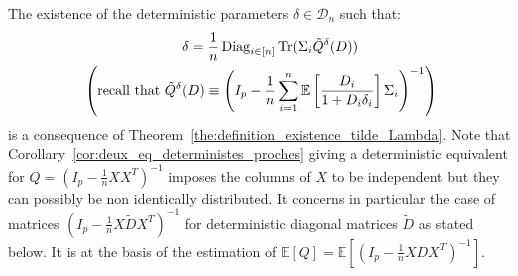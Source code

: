 \documentclass[a4papaer, titlepage]{book}
\begin{document}
The existence of the deterministic parameters $\delta \in \mathcal D_n$ such that:
\begin{align*}
   &\hspace{2.5cm}\delta = \frac{1}{n} \operatorname{Diag}_{i\in [n]} \operatorname{Tr} (\Sigma_i \tilde Q^\delta(D))\\
   & \left( \text{recall that } \tilde Q^\delta(D) \equiv  \left( I_p - \frac{1}{n} \sum_{i=1}^n \mathbb E \left[ \frac{D_i}{1+ D_i \delta_i} \right] \Sigma_i \right)^{-1}\right)
 \end{align*} 
 is a consequence of Theorem~\ref{the:definition_existence_tilde_Lambda}.
Note that Corollary~\ref{cor:deux_eq_deterministes_proches} giving a deterministic equivalent for $Q = (I_p - \frac{1}{n}XX^T)^{-1}$ imposes the columns of $X$ to be independent but they can possibly be non identically distributed. It concerns in particular the case of matrices $(I_p - \frac{1}{n}X \tilde DX^T)^{-1}$ for deterministic diagonal matrices $\tilde D$ as stated below.
It is at the basis of the estimation of $\mathbb E[Q] = \mathbb E[(I_p - \frac{1}{n}XDX^T)^{-1}]$.
\end{document}
